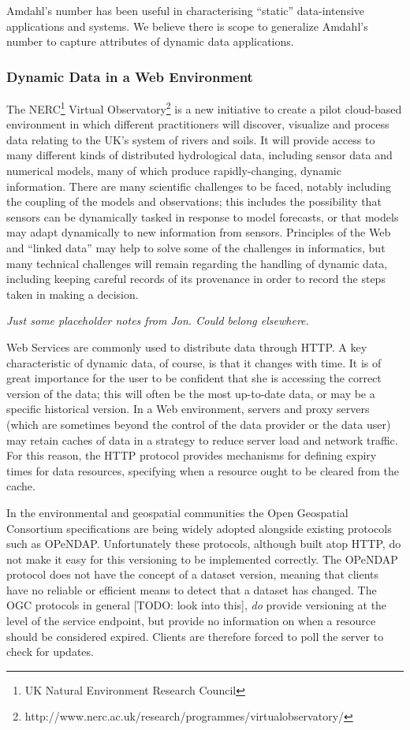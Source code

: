 \documentclass[preprint,12pt]{article}
\begin{document}
Amdahl’s number has been useful in characterising “static”
data-intensive applications and systems. We believe there is scope to
generalize Amdahl’s number to capture attributes of dynamic data
applications.

\subsubsection{Dynamic Data in a Web Environment}

The NERC\footnote{UK Natural Environment Research Council} Virtual
Observatory\footnote{http://www.nerc.ac.uk/research/programmes/virtualobservatory/}
is a new initiative to create a pilot cloud-based environment in which
different practitioners will discover, visualize and process data
relating to the UK's system of rivers and soils.  It will provide
access to many different kinds of distributed hydrological data,
including sensor data and numerical models, many of which produce
rapidly-changing, dynamic information.  There are many scientific
challenges to be faced, notably including the coupling of the models
and observations; this includes the possibility that sensors can be
dynamically tasked in response to model forecasts, or that models may
adapt dynamically to new information from sensors.  Principles of the
Web and ``linked data'' may help to solve some of the challenges in
informatics, but many technical challenges will remain regarding the
handling of dynamic data, including keeping careful records of its
provenance in order to record the steps taken in making a decision.

\emph{Just some placeholder notes from Jon.  Could belong elsewhere.}

Web Services are commonly used to distribute data through HTTP.  A key
characteristic of dynamic data, of course, is that it changes with
time.  It is of great importance for the user to be confident that she
is accessing the correct version of the data; this will often be the
most up-to-date data, or may be a specific historical version.  In a
Web environment, servers and proxy servers (which are sometimes beyond
the control of the data provider or the data user) may retain caches
of data in a strategy to reduce server load and network traffic.  For
this reason, the HTTP protocol provides mechanisms for defining expiry
times for data resources, specifying when a resource ought to be
cleared from the cache.

In the environmental and geospatial communities the Open Geospatial
Consortium specifications are being widely adopted alongside existing
protocols such as OPeNDAP.  Unfortunately these protocols, although
built atop HTTP, do not make it easy for this versioning to be
implemented correctly.  The OPeNDAP protocol does not have the concept
of a dataset version, meaning that clients have no reliable or
efficient means to detect that a dataset has changed.  The OGC
protocols in general [TODO: look into this], \emph{do} provide
versioning at the level of the service endpoint, but provide no
information on when a resource should be considered expired.  Clients
are therefore forced to poll the server to check for updates.
\end{document}
